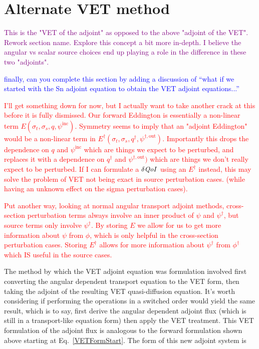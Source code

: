 \documentclass[12pt]{report}
\newcommand{\sigt}{\sigma_t}
\newcommand{\sigs}{\sigma_s}
\newcommand{\qoi}{{\it QoI}\xspace}
\newcommand{\comment}[2]{\marginpar{\textcolor{#2}{$\star$}}\textcolor{#2}{#1}\newline}
\newcommand{\iwh}[1]{\comment{#1}{red}}
\newcommand{\jcr}[1]{\comment{#1}{blue}}
\newcommand{\todo}[1]{\comment{#1}{purple}}
\newcommand{\iwh}[1]{\phantom{a}}
\newcommand{\jcr}[1]{\phantom{a}}
\newcommand{\todo}[1]{\phantom{a}}
\begin{document}
\section{Alternate VET method}
\todo{This is the "VET of the adjoint" as opposed to the above "adjoint of the VET". Rework section name. Explore this concept a bit more in-depth. I believe the angular vs scalar source choices end up playing a role in the difference in these two "adjoints".}


\jcr{finally, can you complete this section by adding a discussion of "`what if we started with the Sn adjoint equation to obtain the VET adjoint equations..."'}


\iwh{I'll get something down for now, but I actually want to take another crack at this before it is fully dismissed. Our forward Eddington is essentially a non-linear term $E(\sigt,\sigs,q,\psi^{\text{inc}})$. Symmetry seems to imply that an "adjoint Eddington" would be a non-linear term in $E^\dag(\sigt,\sigs,q^\dag,\psi^{\dag,\text{out}})$. Importantly this drops the dependence on $q$ and $\psi^{\text{inc}}$ which are things we expect to be perturbed, and replaces it with a dependence on $q^\dag$ and $\psi^{\dag,\text{out}})$ which are things we don't really expect to be perturbed. If I can formulate a $\delta \qoi$ using an $E^\dag$ instead, this may solve the problem of VET not being exact in source perturbation cases. (while having an unknown effect on the sigma perturbation cases).}


\iwh{Put another way, looking at normal angular transport adjoint methods, cross-section perturbation terms always involve an inner product of $\psi$ and $\psi^\dag$, but source terms only involve $\psi^\dag$. By storing $E$ we allow for us to get more information about $\psi$ from $\phi$, which is only helpful in the cross-section perturbation cases. Storing $E^\dag$ allows for more information about $\psi^\dag$ from $\phi^\dag$ which IS useful in the source cases.}

The method by which the VET adjoint equation was formulation involved first converting the angular dependent transport equation to the VET form, then taking the adjoint of the resulting VET quasi-diffusion equation. It's worth considering if performing the operations in a switched order would yield the same result, which is to say, first derive the angular dependent adjoint flux (which is still in a transport-like equation form) then apply the VET treatment. This VET formulation of the adjoint flux is analogous to the forward formulation shown above starting at   Eq.~\eqref{VETFormStart}. The form of this new adjoint system is
\end{document}
